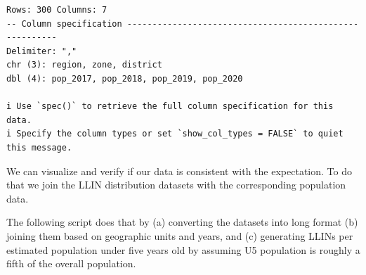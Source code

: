 \documentclass[
  letterpaper,
  DIV=11,
  numbers=noendperiod]{scrreprt}
\begin{document}
\begin{verbatim}
Rows: 300 Columns: 7
-- Column specification --------------------------------------------------------
Delimiter: ","
chr (3): region, zone, district
dbl (4): pop_2017, pop_2018, pop_2019, pop_2020

i Use `spec()` to retrieve the full column specification for this data.
i Specify the column types or set `show_col_types = FALSE` to quiet this message.
\end{verbatim}

We can visualize and verify if our data is consistent with the
expectation. To do that we join the LLIN distribution datasets with the
corresponding population data.

The following script does that by (a) converting the datasets into long
format (b) joining them based on geographic units and years, and (c)
generating LLINs per estimated population under five years old by
assuming U5 population is roughly a fifth of the overall population.
\end{document}
